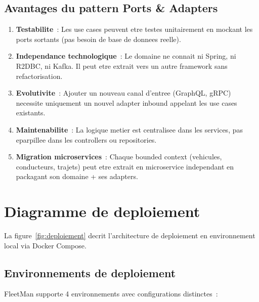 \documentclass[12pt,a4paper]{report}
\begin{document}
\subsection{Avantages du pattern Ports \& Adapters}

\begin{enumerate}[leftmargin=2cm]
  \item \textbf{Testabilite}~: Les use cases peuvent etre testes unitairement
        en mockant les ports sortants (pas besoin de base de donnees reelle).
        
  \item \textbf{Independance technologique}~: Le domaine ne connait ni Spring,
        ni R2DBC, ni Kafka. Il peut etre extrait vers un autre framework
        sans refactorisation.
        
  \item \textbf{Evolutivite}~: Ajouter un nouveau canal d'entree (GraphQL,
        gRPC) necessite uniquement un nouvel adapter inbound appelant
        les use cases existants.
        
  \item \textbf{Maintenabilite}~: La logique metier est centralisee dans
        les services, pas eparpillee dans les controllers ou repositories.
        
  \item \textbf{Migration microservices}~: Chaque bounded context (vehicules,
        conducteurs, trajets) peut etre extrait en microservice independant
        en packagant son domaine + ses adapters.
\end{enumerate}

\section{Diagramme de deploiement}

La figure~\ref{fig:deploiement} decrit l'architecture de deploiement
en environnement local via Docker Compose.

\subsection{Environnements de deploiement}

FleetMan supporte 4 environnements avec configurations distinctes~:
\end{document}
